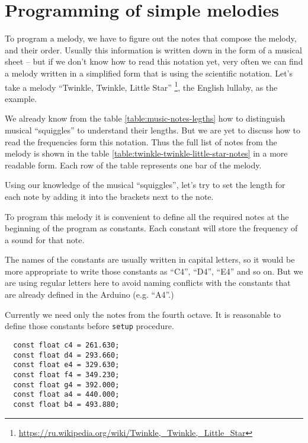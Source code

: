 \documentclass[../sparc.tex]{subfiles}
\begin{document}
\section{Programming of simple melodies}

To program a melody, we have to figure out the notes that compose the melody,
and their order.  Usually this information is written down in the form of a
musical sheet -- but if we don't know how to read this notation yet, very often
we can find a melody written in a simplified form that is using the scientific
notation.  Let's take a melody ``Twinkle, Twinkle, Little
Star'' \footnote{\url{https://ru.wikipedia.org/wiki/Twinkle,_Twinkle,_Little_Star}}, the English lullaby, as the example.


We already know from the table \ref{table:music-notes-legths} how to distinguish
musical ``squiggles'' to understand their lengths.  But we are yet to discuss
how to read the frequencies form this notation.  Thus the full list of notes
from the melody is shown in the table
\ref{table:twinkle-twinkle-little-star-notes} in a more readable form.  Each row
of the table represents one bar of the melody.


Using our knowledge of the musical ``squiggles'', let's try to set the length
for each note by adding it into the brackets next to the note.


To program this melody it is convenient to define all the required notes at the
beginning of the program as constants.  Each constant will store the frequency
of a sound for that note.

The names of the constants are usually written in capital letters, so it would
be more appropriate to write those constants as ``C4'', ``D4'', ``E4'' and so
on.  But we are using regular letters here to avoid naming conflicts with the
constants that are already defined in the Arduino (e.g. ``A4''.)

Currently we need only the notes from the fourth octave.  It is reasonable to
define those constants before \texttt{setup} procedure.

\begin{verbatim}
  const float c4 = 261.630;
  const float d4 = 293.660;
  const float e4 = 329.630;
  const float f4 = 349.230;
  const float g4 = 392.000;
  const float a4 = 440.000;
  const float b4 = 493.880;
\end{verbatim}
\end{document}

